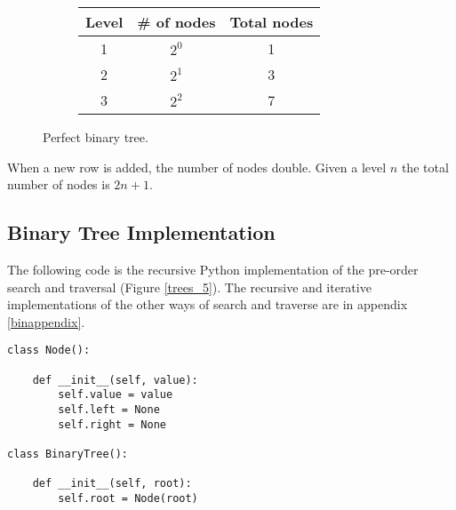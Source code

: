 \begin{figure}[H]
\centering
\begin{subfigure}[b]{0.4\linewidth}
\centering
{}
\end{subfigure}
\hspace{1em}
\begin{subfigure}[b]{0.4\linewidth}
\centering
\begin{tabular}[b]{c c c}
 Level & \# of nodes & Total nodes  \\
\hline
1 & $2^{0}$ & 1 \\
2 & $2^{1}$ & 3 \\
3 & $2^{2}$ & 7
\end{tabular}
\end{subfigure}
\caption[Perfect binary tree.]{Perfect binary tree.}
\label{trees_11}
\end{figure}

When a new row is added, the number of nodes double. Given a level \(n\) the total number of nodes is \(2n + 1\).

\subsection{Binary Tree Implementation}
The following code is the recursive Python implementation of the pre-order search and traversal (Figure \ref{trees_5}). The recursive and iterative implementations of the other ways of search and traverse are in appendix \ref{binappendix}.

\begin{lstlisting}[firstnumber=1, caption={Class definition for a node and a tree.}]
class Node():

	def __init__(self, value):
		self.value = value
		self.left = None
		self.right = None

class BinaryTree():

	def __init__(self, root):
		self.root = Node(root)
\end{lstlisting}

